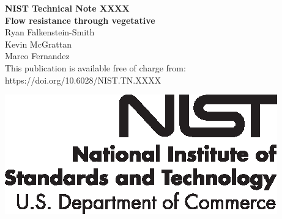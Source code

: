 \documentclass[12pt]{article}
\newcommand{\pubnumber}{XXXX}
\newcommand{\DOI}{https://doi.org/10.6028/NIST.TN.XXXX}
\begin{document}
	
	\begin{titlepage}
		\begin{flushright}
\LARGE{\textbf{NIST Technical Note \pubnumber}}\\
\vfill
\Huge{\textbf{Flow resistance through vegetative}}\\
\vfill
\large Ryan Falkenstein-Smith\\
\large Kevin McGrattan\\
\large Marco Fernandez \\
\vfill
\normalsize This publication is available free of charge from:\\
\DOI\\
\vfill

\includegraphics[width=0.3\linewidth]{NIST-logo.eps}\\ 


\end{flushright}
\end{titlepage}
\end{document}

